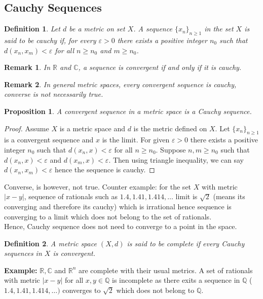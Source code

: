 \documentclass[12pt]{report}
\newtheorem{defn}{Definition}
\newtheorem*{rem}{Remark}
\newtheorem{prop}{Proposition}
\begin{document}
\subsection*{Cauchy Sequences}
\begin{defn}
    Let $d$ be a metric on set $X$. A sequence $\{x_n\}_{n \geq 1}$ in the set $X$ is said to be cauchy if, for every $\varepsilon > 0$ there exists a positive integer $n_0$ such that $d(x_n,x_m)< \varepsilon$ for all $n \geq n_0$ and $m \geq n_0$.
\end{defn}
\begin{rem}
    In $\mathbb{R}$ and $\mathbb{C}$, a sequence is convergent if and only if it is cauchy.
\end{rem}
\begin{rem}
    In general metric spaces, every convergent sequence is cauchy, converse is not necessarily true.
\end{rem}
\begin{prop}
    A convergent sequence in a metric space is a Cauchy sequence.
\end{prop}
\begin{proof}
    Assume $X$ is a metric space and $d$ is the metric defined on $X$. Let $\{x_n\}_{n \geq 1}$ is a convergent sequence and $x$ is the limit. For given $\varepsilon > 0$ there exists a positive integer $n_0$ such that $d(x_n, x) < \varepsilon$ for all $n \geq n_0$. Suppose $n,m \geq n_0$ such that $d(x_n, x) < \varepsilon$ and $d(x_m, x) < \varepsilon$. Then using triangle inequality, we can say $d(x_n, x_m) < \varepsilon$ hence the sequence is cauchy. 
\end{proof}
Converse, is however, not true. Counter example: for the set $X$ with metric $|x - y|$, sequence of rationals such as $1.4, 1.41, 1.414, \dots $ limit is $\sqrt{2}$ (means its converging and therefore its cauchy) which is irrational hence sequence is converging to a limit which does not belong to the set of rationals.\\
Hence, Cauchy sequence does not need to converge to a point in the space.
\begin{defn}
    A metric space $(X,d)$ is said to be complete if every Cauchy sequences in $X$ is convergent.
\end{defn}
\textbf{Example:} $\mathbb{R},\mathbb{C}$ and $\mathbb{R}^n$ are complete with their usual metrics. A set of rationals with metric $|x - y|$ for all $x,y \in \mathbb{Q}$ is incomplete as there exits a sequence in $\mathbb{Q}$ ($1.4, 1.41, 1.414, \dots)$ converges to $\sqrt{2}$ which does not belong to $\mathbb{Q}$.
\end{document}
